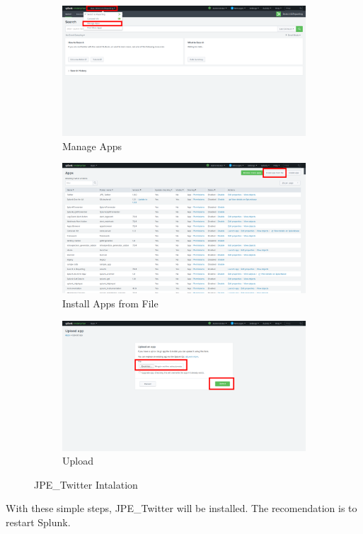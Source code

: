 \documentclass[report]{article}
\begin{document}
\begin{figure}[h!]
  \centering
  \begin{subfigure}[b]{0.49\linewidth}
    \includegraphics[width=\linewidth]{img/a.png}
     \caption{\color{text} Manage Apps}
  \end{subfigure}
  \begin{subfigure}[b]{0.49\linewidth}
    \includegraphics[width=\linewidth]{img/b.png}
    \caption{\color{text} Install Apps from File}
  \end{subfigure}
  \begin{subfigure}[b]{0.49\linewidth}
    \includegraphics[width=\linewidth]{img/c.png}
    \caption{\color{text} Upload}
  \end{subfigure}
  \caption{\color{text}JPE\_Twitter Intalation}
  \label{fig:instalacion}
\end{figure}
With these simple steps, JPE\_Twitter will be installed. The recomendation is to restart Splunk.
\newpage
\end{document}
